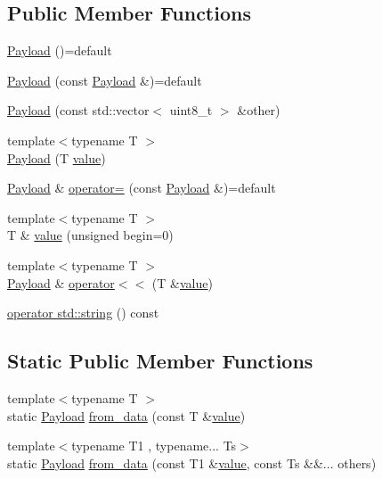 \subsection*{Public Member Functions}
\begin{DoxyCompactItemize}
\item 
\hyperlink{class_c_a_nopen_1_1_payload_a1b22524210c44e52820944fdd041484f}{Payload} ()=default
\item 
\hyperlink{class_c_a_nopen_1_1_payload_a1177f8bbace9e9779c7549ae7ace1681}{Payload} (const \hyperlink{class_c_a_nopen_1_1_payload}{Payload} \&)=default
\item 
\hyperlink{class_c_a_nopen_1_1_payload_ab0769e01554cc879840463e2a55eab0e}{Payload} (const std\+::vector$<$ uint8\+\_\+t $>$ \&other)
\item 
{\footnotesize template$<$typename T $>$ }\\\hyperlink{class_c_a_nopen_1_1_payload_a769f01631bd710d3b37f07cc2753b889}{Payload} (T \hyperlink{class_c_a_nopen_1_1_payload_aef05ef8cfc8b9ba4170891f3168a726b}{value})
\item 
\hyperlink{class_c_a_nopen_1_1_payload}{Payload} \& \hyperlink{class_c_a_nopen_1_1_payload_a646541a9ec787a3fcdbbcba153e8553c}{operator=} (const \hyperlink{class_c_a_nopen_1_1_payload}{Payload} \&)=default
\item 
{\footnotesize template$<$typename T $>$ }\\T \& \hyperlink{class_c_a_nopen_1_1_payload_aef05ef8cfc8b9ba4170891f3168a726b}{value} (unsigned begin=0)
\item 
{\footnotesize template$<$typename T $>$ }\\\hyperlink{class_c_a_nopen_1_1_payload}{Payload} \& \hyperlink{class_c_a_nopen_1_1_payload_a7386499320878a2ab437f419f9970d7c}{operator$<$$<$} (T \&\hyperlink{class_c_a_nopen_1_1_payload_aef05ef8cfc8b9ba4170891f3168a726b}{value})
\item 
\hyperlink{class_c_a_nopen_1_1_payload_a61e7092a555d000dfd59c6942823c9f1}{operator std\+::string} () const
\end{DoxyCompactItemize}
\subsection*{Static Public Member Functions}
\begin{DoxyCompactItemize}
\item 
{\footnotesize template$<$typename T $>$ }\\static \hyperlink{class_c_a_nopen_1_1_payload}{Payload} \hyperlink{class_c_a_nopen_1_1_payload_a1264ea3795f5d7e1a1a153121b15e25f}{from\+\_\+data} (const T \&\hyperlink{class_c_a_nopen_1_1_payload_aef05ef8cfc8b9ba4170891f3168a726b}{value})
\item 
{\footnotesize template$<$typename T1 , typename... Ts$>$ }\\static \hyperlink{class_c_a_nopen_1_1_payload}{Payload} \hyperlink{class_c_a_nopen_1_1_payload_aeb95d2ae0204e12a46df4d7c97788739}{from\+\_\+data} (const T1 \&\hyperlink{class_c_a_nopen_1_1_payload_aef05ef8cfc8b9ba4170891f3168a726b}{value}, const Ts \&\&... others)
\end{DoxyCompactItemize}


